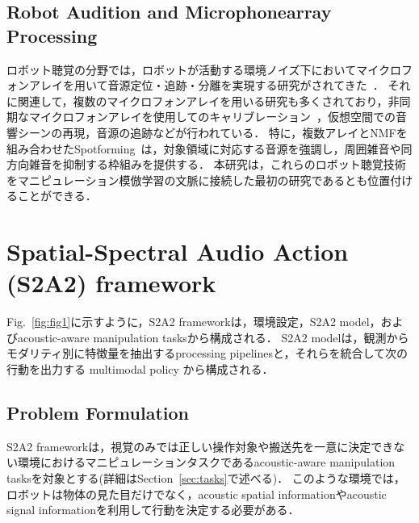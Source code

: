 \documentclass{article}
\begin{document}
\subsection{Robot Audition and Microphonearray Processing}
ロボット聴覚の分野では，ロボットが活動する環境ノイズ下においてマイクロフォンアレイを用いて音源定位・追跡・分離を実現する研究がされてきた~\citep{nakadai2020robotaudition,robotaudition_review2025}．
それに関連して，複数のマイクロフォンアレイを用いる研究も多くされており，非同期なマイクロフォンアレイを使用してのキャリブレーション~\citep{wang2024slamcalib}，仮想空間での音響シーンの再現\cite{gabriel20192d}，音源の追跡\citep{yamada2020sound}などが行われている．
特に，複数アレイとNMFを組み合わせたSpotforming~\citep{spotforming_nmf}は，対象領域に対応する音源を強調し，周囲雑音や同方向雑音を抑制する枠組みを提供する．
本研究は，これらのロボット聴覚技術をマニピュレーション模倣学習の文脈に接続した最初の研究であるとも位置付けることができる．

\section{Spatial-Spectral Audio Action (S2A2) framework}
\label{sec:s2a2_framework}

	Fig.~\ref{fig:fig1}に示すように，S2A2 frameworkは，環境設定，S2A2 model，およびacoustic-aware manipulation tasksから構成される．
	S2A2 modelは，観測からモダリティ別に特徴量を抽出するprocessing pipelinesと，それらを統合して次の行動を出力する multimodal policy から構成される．
	

\subsection{Problem Formulation}
\label{sec:problem}
	S2A2 frameworkは，視覚のみでは正しい操作対象や搬送先を一意に決定できない環境におけるマニピュレーションタスクであるacoustic-aware manipulation tasksを対象とする(詳細はSection~\ref{sec:tasks}で述べる)．
	このような環境では，ロボットは物体の見た目だけでなく，acoustic spatial informationやacoustic signal informationを利用して行動を決定する必要がある．
\end{document}
